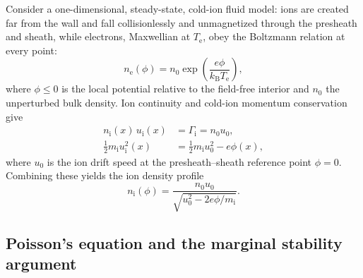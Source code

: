 Consider a one-dimensional, steady-state, cold-ion fluid model: ions are created far from the wall and fall collisionlessly and unmagnetized through the presheath and sheath, while electrons, Maxwellian at $T_{\mathrm{e}}$, obey the Boltzmann relation at every point:
\begin{equation}
n_{\mathrm{e}}(\phi) = n_{0} \exp\!\left( \frac{e \phi}{k_{\mathrm{B}} T_{\mathrm{e}}} \right),
\label{ch03-eq:electron-boltzmann}
\end{equation}
where $\phi \le 0$ is the local potential relative to the field-free interior and $n_{0}$ the unperturbed bulk density. Ion continuity and cold-ion momentum conservation give
\begin{align}
n_{\mathrm{i}}(x)\, u_{\mathrm{i}}(x) &= \Gamma_{\mathrm{i}} = n_{0} u_{0}, \label{eq:ion-continuity}\\
\frac{1}{2} m_{\mathrm{i}} u_{\mathrm{i}}^{2}(x) &= \frac{1}{2} m_{\mathrm{i}} u_{0}^{2} - e \phi(x), \label{eq:ion-energy}
\end{align}
where $u_{0}$ is the ion drift speed at the presheath--sheath reference point $\phi=0$. Combining these yields the ion density profile
\begin{equation}
n_{\mathrm{i}}(\phi) = \frac{n_{0} u_{0}}{\sqrt{u_{0}^{2} - 2 e \phi/m_{\mathrm{i}}}}.
\label{eq:ion-density-profile}
\end{equation}

\subsection{Poisson's equation and the marginal stability argument}

